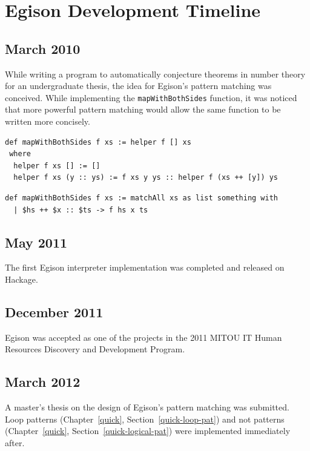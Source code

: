 \chapter{Egison Development Timeline}

\section*{March 2010}

While writing a program to automatically conjecture theorems in number theory for an undergraduate thesis, the idea for Egison's pattern matching was conceived.
While implementing the \lstinline{mapWithBothSides} function, it was noticed that more powerful pattern matching would allow the same function to be written more concisely.
\begin{lstlisting}[language=egison,numbers=none]
def mapWithBothSides f xs := helper f [] xs
 where
  helper f xs [] := []
  helper f xs (y :: ys) := f xs y ys :: helper f (xs ++ [y]) ys
\end{lstlisting}
\begin{lstlisting}[language=egison,numbers=none]
def mapWithBothSides f xs := matchAll xs as list something with
  | $hs ++ $x :: $ts -> f hs x ts
\end{lstlisting}

\section*{May 2011}

The first Egison interpreter implementation was completed and released on Hackage.

\section*{December 2011}

Egison was accepted as one of the projects in the 2011 MITOU IT Human Resources Discovery and Development Program.

\section*{March 2012}

A master's thesis on the design of Egison's pattern matching was submitted.
Loop patterns (Chapter~\ref{quick}, Section~\ref{quick-loop-pat}) and not patterns (Chapter~\ref{quick}, Section~\ref{quick-logical-pat}) were implemented immediately after.

